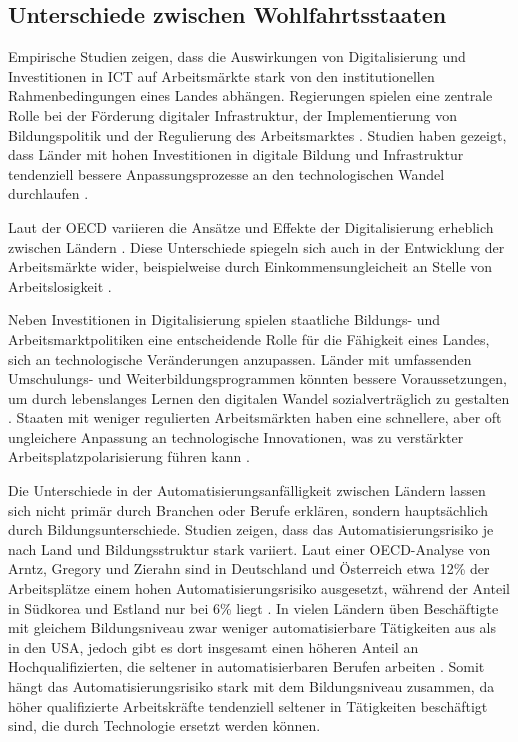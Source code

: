 
\subsection{Unterschiede zwischen Wohlfahrtsstaaten}

Empirische Studien zeigen, dass die Auswirkungen von Digitalisierung und Investitionen in 
\ac{ICT} auf Arbeitsmärkte stark von den institutionellen Rahmenbedingungen eines Landes 
abhängen. Regierungen spielen eine zentrale Rolle bei der Förderung digitaler Infrastruktur, der 
Implementierung von Bildungspolitik und der Regulierung des Arbeitsmarktes 
\parencite[vgl.][S. 4–5]{hall2001varieties}. Studien haben gezeigt, dass Länder mit hohen 
Investitionen in digitale Bildung und Infrastruktur tendenziell bessere Anpassungsprozesse an den 
technologischen Wandel durchlaufen \parencite[vgl.][S. 109–111]{oecd2020digital}.

Laut der \ac{OECD} variieren die Ansätze und Effekte der Digitalisierung erheblich zwischen 
Ländern \parencite[vgl.][S. 95–98]{oecd2020digital}. Diese Unterschiede spiegeln sich auch in der 
Entwicklung der Arbeitsmärkte wider, beispielweise durch Einkommensungleicheit an Stelle von  
Arbeitslosigkeit \parencite[vgl.][S. 56–58]{nickell1997unemployment}.

Neben Investitionen in Digitalisierung spielen staatliche Bildungs- und Arbeitsmarktpolitiken 
eine entscheidende Rolle für die Fähigkeit eines Landes, sich an technologische Veränderungen 
anzupassen. Länder mit umfassenden Umschulungs- und Weiterbildungsprogrammen könnten bessere 
Voraussetzungen, um durch lebenslanges Lernen den digitalen Wandel sozialverträglich zu gestalten 
\parencite[vgl.][S. 360]{vu2011ict}. 
Staaten mit weniger regulierten Arbeitsmärkten haben eine schnellere, aber oft ungleichere 
Anpassung an technologische Innovationen, was zu verstärkter Arbeitsplatzpolarisierung führen 
kann \parencite[vgl.][S. 40–41]{hall2001varieties}.

Die Unterschiede in der Automatisierungsanfälligkeit zwischen Ländern lassen sich nicht primär 
durch Branchen oder Berufe erklären, sondern hauptsächlich durch Bildungsunterschiede. Studien 
zeigen, dass das Automatisierungsrisiko je nach Land und Bildungsstruktur stark variiert. Laut 
einer OECD-Analyse von Arntz, Gregory und Zierahn sind in Deutschland und Österreich etwa 12\% 
der Arbeitsplätze einem hohen Automatisierungsrisiko ausgesetzt, während der Anteil in Südkorea 
und Estland nur bei 6\% liegt \parencite[S. 15–16]{arntz2016therisk}. In vielen Ländern üben 
Beschäftigte mit gleichem Bildungsniveau zwar weniger automatisierbare Tätigkeiten aus als in den 
USA, jedoch gibt es dort insgesamt einen höheren Anteil an Hochqualifizierten, die seltener in 
automatisierbaren Berufen arbeiten \parencite[vgl.][S. 16]{arntz2016therisk}. Somit hängt das 
Automatisierungsrisiko stark mit dem Bildungsniveau zusammen, da höher qualifizierte 
Arbeitskräfte tendenziell seltener in Tätigkeiten beschäftigt sind, die durch Technologie ersetzt 
werden können.

